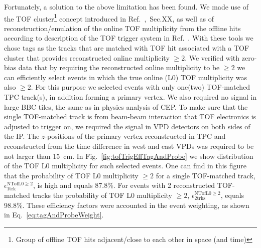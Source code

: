 Fortunately, a solution to the above limitation has been found. We made use of the TOF cluster\footnote{Group of offline TOF hits adjacent/close to each other in space (and time)} concept introduced in Ref.~\cite{AnalysisNoteRafal},~Sec.XX, as well as of reconstruction/emulation of the online TOF multiplicity from the offline hits according to description of the TOF trigger system in Ref.~\cite{tofL0MultExplanation}. With these tools we chose tags as the tracks that are matched with TOF hit associated with a TOF cluster that provides reconstructed online multiplicity $\geq 2$. We verified with zero-bias data that by requiring the reconstructed online multiplicity to be $\geq 2$ we can efficiently select events in which the true online (L0) TOF multiplicity was also $\geq 2$. For this purpose we selected events with only one(two) TOF-matched TPC track(s), in addition forming a primary vertex. We also required no signal in large BBC tiles, the same as in physics analysis of CEP. To make sure that the single TOF-matched track is from beam-beam interaction that TOF electronics is adjusted to trigger on, we required the signal in VPD detectors on both sides of the IP. The $z$-positions of the primary vertex reconstructed in TPC and reconstructed from the time difference in west and east VPDs was required to be not larger than 15~cm. In Fig.~\ref{fig:tofTrigEffTagAndProbe} we show distribution of the TOF L0 multiplicity for such selected events. One can find in this figure that the probability of TOF L0 multiplicity $\geq 2$ for a single TOF-matched track, $\epsilon^{\text{NTofL0}\geq2}_{1\text{trk}}$, is high and equals 87.8\%. For events with 2 reconstructed TOF-matched tracks the probability of TOF L0 multiplicity $\geq 2$, $\epsilon^{\text{NTofL0}\geq2}_{2\text{trks}}$, equals 98.8\%. These efficiency factors were accounted in the event weighting, as shown in Eq.~\eqref{eq:tagAndProbeWeight}.
 
